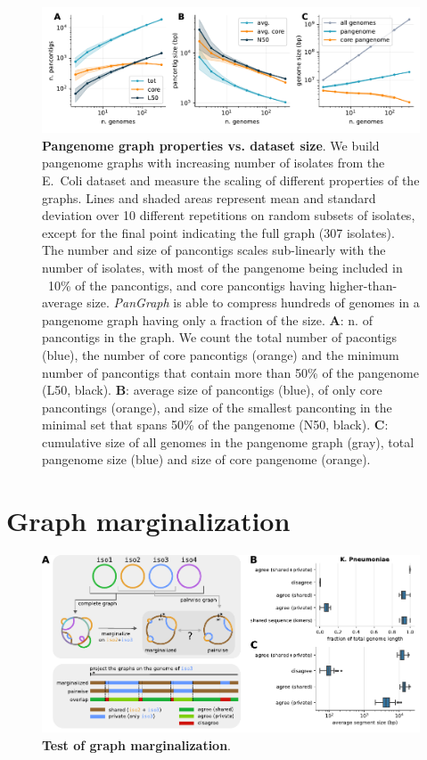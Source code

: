 \documentclass[aps,rmp,reprint,superscriptaddress,notitlepage,10pt]{revtex4-1}
\begin{document}
\begin{figure}[htb]
    \includegraphics[width=.9\textwidth]{figs/incr_size.pdf}
    \caption{{\bf Pangenome graph properties vs. dataset size}.
        We build pangenome graphs with increasing number of isolates from the E.~Coli dataset and measure the scaling of different properties of the graphs. Lines and shaded areas represent mean and standard deviation over 10 different repetitions on random subsets of isolates, except for the final point indicating the full graph (307 isolates).
        The number and size of pancontigs scales sub-linearly with the number of isolates, with most of the pangenome being included in ~10\% of the pancontigs, and core pancontigs having higher-than-average size. \textit{PanGraph} is able to compress hundreds of genomes in a pangenome graph having only a fraction of the size.
        \textbf{A}: n. of pancontigs in the graph. We count the total number of pacontigs (blue), the number of core pancontigs (orange) and the minimum number of pancontigs that contain more than 50\% of the pangenome (L50, black).
        \textbf{B}: average size of pancontigs (blue), of only core pancontings (orange), and size of the smallest panconting in the minimal set that spans 50\% of the pangenome (N50, black).
        \textbf{C}: cumulative size of all genomes in the pangenome graph (gray), total pangenome size (blue) and size of core pangenome (orange).
    }
    \label{fig:panx-size}
\end{figure}

\section{Graph marginalization}

\begin{figure}[htb]
    \includegraphics[width=\textwidth]{figs/marginalize_test.pdf}
    \caption{{\bf Test of graph marginalization}.}
    \label{fig:marginalization}
\end{figure}
\end{document}
